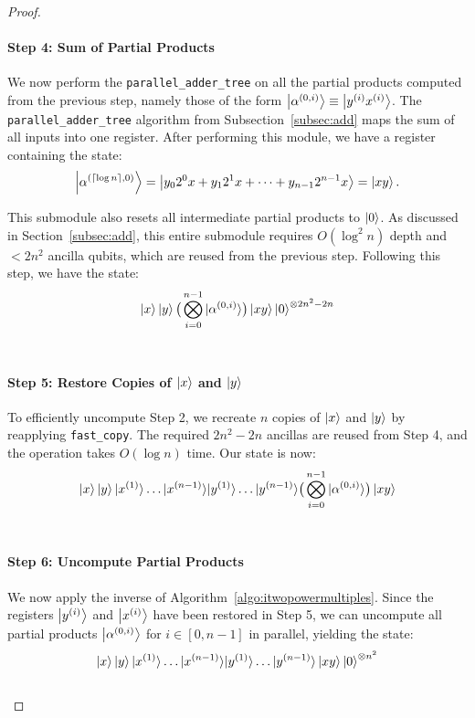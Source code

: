 \documentclass[reprint,amsmath,amssymb,aps,pra]{revtex4-2}
\newcommand{\smallket}[1]{{|{#1}\rangle}}
\begin{document}
\begin{proof}
    \paragraph{Step 4: Sum of Partial Products}

    We now perform the \texttt{parallel\_adder\_tree} on all the partial products computed from the previous step, namely those of the form $\ket{\alpha^{(0,i)}} \equiv \ket{y^{(i)}x^{(i)}}$. The \texttt{parallel\_adder\_tree} algorithm from Subsection~\ref{subsec:add} maps the sum of all inputs into one register. After performing this module, we have a register containing the state:
    \begin{align}
        \ket{\alpha^{(\lceil\log{n}\rceil,0)}} = \ket{y_02^0x+y_12^1x+\dots+y_{n-1}2^{n-1}x} = \ket{xy}.
    \end{align}

    This submodule also resets all intermediate partial products to $\ket{0}$. As discussed in Section~\ref{subsec:add}, this entire submodule requires $O(\log^2{n})$ depth and $< 2n^2$ ancilla qubits, which are reused from the previous step. Following this step, we have the state:
    \begin{align}
        \ket{x}\ket{y}\big(\bigotimes_{i=0}^{n-1}\smallket{\alpha^{(0,i)}}\big)\ket{xy}\ket{0}^{\otimes 2n^2-2n} 
    \end{align}\\

    \paragraph{Step 5: Restore Copies of $\ket{x}$ and $\ket{y}$}
    To efficiently uncompute Step 2, we recreate $n$ copies of $\ket{x}$ and $\ket{y}$ by reapplying \texttt{fast\_copy}. The required $2n^2-2n$ ancillas are reused from Step 4, and the operation takes $O(\log n)$ time. Our state is now:
    \begin{align}
        \ket{x}\ket{y}\smallket{x^{(1)}}\dots\smallket{x^{(n-1)}}\smallket{y^{(1)}}\dots\smallket{y^{(n-1)}}\big(\bigotimes_{i=0}^{n-1}\smallket{\alpha^{(0,i)}}\big)\ket{xy}
    \end{align}\\

    \paragraph{Step 6: Uncompute Partial Products}
    We now apply the inverse of Algorithm~\ref{algo:itwopowermultiples}. Since the registers $\ket{y^{(i)}}$ and $\ket{x^{(i)}}$ have been restored in Step 5, we can uncompute all partial products $\ket{\alpha^{(0,i)}}$ for $i\in[0,n-1]$ in parallel, yielding the state:
    \begin{align}
        \ket{x}\ket{y}\smallket{x^{(1)}}\dots\smallket{x^{(n-1)}}\smallket{y^{(1)}}\dots\smallket{y^{(n-1)}}\ket{xy}\ket{0}^{\otimes n^2}
    \end{align}\\


\end{proof}
\end{document}

